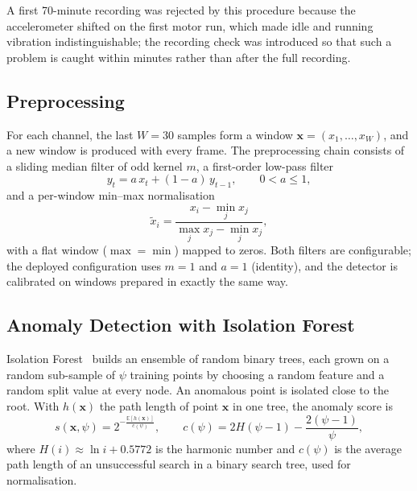 A first 70-minute recording was rejected by this procedure because the accelerometer shifted on the first motor run, which made idle and running vibration indistinguishable; the recording check was introduced so that such a problem is caught within minutes rather than after the full recording.

\subsection{Preprocessing}

For each channel, the last $W = 30$ samples form a window $\mathbf{x} = (x_1, \dots, x_W)$, and a new window is produced with every frame. The preprocessing chain consists of a sliding median filter of odd kernel $m$, a first-order low-pass filter
\begin{equation}
y_t = a\,x_t + (1 - a)\,y_{t-1}, \qquad 0 < a \leq 1,
\end{equation}
and a per-window min--max normalisation
\begin{equation}
\tilde{x}_i = \frac{x_i - \min_j x_j}{\max_j x_j - \min_j x_j},
\end{equation}
with a flat window ($\max = \min$) mapped to zeros. Both filters are configurable; the deployed configuration uses $m = 1$ and $a = 1$ (identity), and the detector is calibrated on windows prepared in exactly the same way.

\subsection{Anomaly Detection with Isolation Forest}

Isolation Forest~\cite{liu2008iforest} builds an ensemble of random binary trees, each grown on a random sub-sample of $\psi$ training points by choosing a random feature and a random split value at every node. An anomalous point is isolated close to the root. With $h(\mathbf{x})$ the path length of point $\mathbf{x}$ in one tree, the anomaly score is
\begin{equation}
s(\mathbf{x}, \psi) = 2^{-\frac{\mathbb{E}[h(\mathbf{x})]}{c(\psi)}}, \qquad c(\psi) = 2H(\psi - 1) - \frac{2(\psi - 1)}{\psi},
\end{equation}
where $H(i) \approx \ln i + 0.5772$ is the harmonic number and $c(\psi)$ is the average path length of an unsuccessful search in a binary search tree, used for normalisation.

